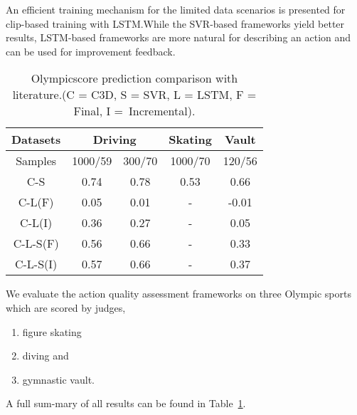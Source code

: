 \documentclass{article}
\begin{document}
An efficient training mechanism for the limited data scenarios is presented for clip-based training with LSTM.While the SVR-based frameworks yield better results, LSTM-based frameworks are more natural for describing an action and can be used for improvement feedback.\par
\begin{table}
\centering
\begin{tabular}{|c|c|c|c|c|}
 \hline
 Datasets & \multicolumn{2}{|c|}{Driving} & Skating & Vault \\ \hline
 Samples & 1000/59 & 300/70 & 1000/70 & 120/56 \\ \hline
 C-S & 0.74 & 0.78 & 0.53 & 0.66 \\ \hline
 C-L(F) & 0.05 & 0.01 & - & -0.01 \\ \hline
 C-L(I) & 0.36 & 0.27 & - & 0.05 \\ \hline
 C-L-S(F) & 0.56 & 0.66 & - & 0.33 \\ \hline
 C-L-S(I) & 0.57 & 0.66 & - & 0.37 \\ \hline
\end{tabular}
\caption{Olympicscore prediction comparison with literature.(C = C3D, S = SVR, L = LSTM, F = Final, I =~Incremental).}
\label{Tab:experiment}
\end{table}
We evaluate the action quality assessment frameworks on three Olympic sports which are scored by judges,
\begin{enumerate}
\item figure skating
\item diving and
\item gymnastic vault.
\end{enumerate}

A full sum-mary of all results can be found in Table~\ref{Tab:experiment}.
\newpage
 

\nocite{*}%
\end{document}
